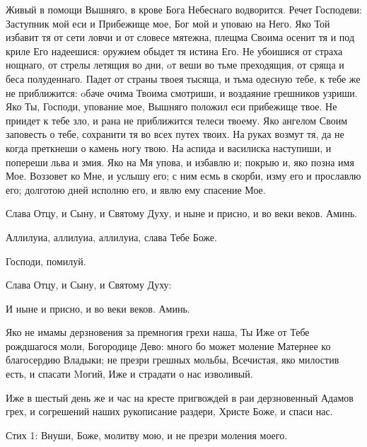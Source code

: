 \begin{mymulticols}


Живый в помощи Вышняго, в крове Бога Небеснаго водворится. Речет Господеви: Заступник мой еси и Прибежище мое, Бог мой и уповаю на Него. Яко Той избавит тя от сети ловчи и от словесе мятежна, плещма Своима осенит тя и под криле Его надеешися: оружием обыдет тя истина Его. Не убоишися от страха нощнаго, от стрелы летящия во дни, oт веши во тьме преходящия, от сряща и беса полуденнаго. Падет от страны твоея тысяща, и тьма одесную тебе, к тебе же не приближится: oбаче очима Твоима смотриши, и воздаяние грешников узриши. Яко Ты, Господи, упование мое, Вышняго положил еси прибежище твое. Не приидет к тебе зло, и рана не приближится телеси твоему. Яко ангелом Своим заповесть о тебе, сохранити тя во всех путех твоих. На руках возмут тя, да не когда преткнеши о камень ногу твою. На аспида и василиска наступиши, и попереши льва и змия. Яко на Мя упова, и избавлю и; покрыю и, яко позна имя Мое. Воззовет ко Мне, и услышу его; с ним есмь в скорби, изму его и прославлю его; долготою дней исполню его, и явлю ему спасение Мое.



Слава Отцу, и Сыну, и Святому Духу, и ныне и присно, и во веки веков. Аминь.

Аллилуиа, аллилуиа, аллилуиа, слава Тебе Боже. 

Господи, помилуй. 

Слава Отцу, и Сыну, и Святому Духу:





И ныне и присно, и во веки веков. Аминь.

 Яко не имамы дерзновения за премногия грехи наша, Ты Иже от Тебе рождшагося моли, Богородице Дево: много бо может моление Матернее ко благосердию Владыки; не презри грешных мольбы, Всечистая, яко милостив есть, и спасати Mогий, Иже и страдати о нас изволивый.



\myemph{[Если Великий пост "--- настоящий тропарь, глас 2:}

Иже в шестый день же и час на кресте пригвождей в раи дерзновенный Адамов грех, и согрешений наших рукописание раздери, Христе Боже, и спаси нас.




Стих 1: Внуши, Боже, молитву мою, и не презри моления моего.





\end{mymulticols}
